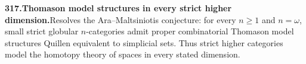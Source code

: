 \documentclass[11pt,a4paper]{article}
\begin{document}
  \par \begin{minipage}{\linewidth}
  \fontsize{10.5}{12.6}\selectfont\RaggedRight
  \hypertarget{result 317}{}
  {\bfseries\textcolor{muted}{317.}\enspace Thomason model structures in every strict higher dimension.}\enspace Resolves the Ara--Maltsiniotis conjecture: for every $n\ge1$ and $n=\omega$, small strict globular $n$-categories admit proper combinatorial Thomason model structures Quillen equivalent to simplicial sets. Thus strict higher categories model the homotopy theory of spaces in every stated dimension.\par
  \end{minipage}\par\vspace{5pt}
\end{document}
